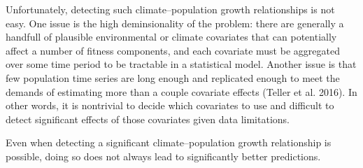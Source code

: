 \documentclass[11pt]{article}
\begin{document}
Unfortunately, detecting such climate--population growth relationships is not easy.
One issue is the high deminsionality of the problem: there are generally a handfull of plausible environmental or climate covariates that can potentially affect a number of fitness components, and each covariate must be aggregated over some time period to be tractable in a statistical model.
Another issue is that few population time series are long enough and replicated enough to meet the demands of estimating more than a couple covariate effects (Teller et al. 2016).
In other words, it is nontrivial to decide which covariates to use and difficult to detect significant effects of those covariates given data limitations.

Even when detecting a significant climate--population growth relationship is possible, doing so does not always lead to significantly better predictions.
\end{document}
